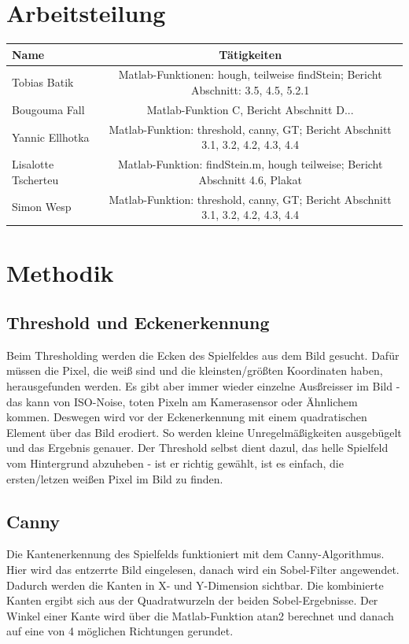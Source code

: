\documentclass[paper=A4, deutsch]{scrartcl}
\begin{document}
\section{Arbeitsteilung}
\begin{center}
  \begin{tabular}{ |l | c | }
    \hline
  Name & Tätigkeiten\\
    \hline
			Tobias Batik & Matlab-Funktionen: hough, teilweise findStein; Bericht Abschnitt: 3.5, 4.5, 5.2.1\\
		\hline
			Bougouma Fall & Matlab-Funktion C, Bericht Abschnitt D...\\
		\hline
			Yannic Ellhotka & Matlab-Funktion: threshold, canny, GT; Bericht Abschnitt 3.1, 3.2, 4.2, 4.3, 4.4\\
		\hline
			Lisalotte Tscherteu & Matlab-Funktion: findStein.m, hough teilweise; Bericht Abschnitt 4.6, Plakat\\
		\hline
			Simon Wesp & Matlab-Funktion: threshold, canny, GT; Bericht Abschnitt 3.1, 3.2, 4.2, 4.3, 4.4\\
		\hline
  \end{tabular}
\end{center}


\section{Methodik}

\subsection{Threshold und Eckenerkennung}
Beim Thresholding werden die Ecken des Spielfeldes aus dem Bild gesucht. Dafür müssen die Pixel, die weiß sind und die kleinsten/größten Koordinaten haben, herausgefunden werden. Es gibt aber immer wieder einzelne Ausßreisser im Bild - das kann von ISO-Noise, toten Pixeln am Kamerasensor oder Ähnlichem kommen. Deswegen wird vor der Eckenerkennung mit einem quadratischen Element über das Bild erodiert. So werden kleine Unregelmäßigkeiten ausgebügelt und das Ergebnis genauer. Der Threshold selbst dient dazul, das helle Spielfeld vom Hintergrund abzuheben - ist er richtig gewählt, ist es einfach, die ersten/letzen weißen Pixel im Bild zu finden.

\subsection{Canny}
Die Kantenerkennung des Spielfelds funktioniert mit dem Canny-Algorithmus. Hier wird das entzerrte Bild eingelesen, danach wird ein Sobel-Filter angewendet. Dadurch werden die Kanten in X- und Y-Dimension sichtbar. Die kombinierte Kanten ergibt sich aus der Quadratwurzeln der beiden Sobel-Ergebnisse. Der Winkel einer Kante wird über die Matlab-Funktion atan2 berechnet und danach auf eine von 4 möglichen Richtungen gerundet. \\
\end{document}
